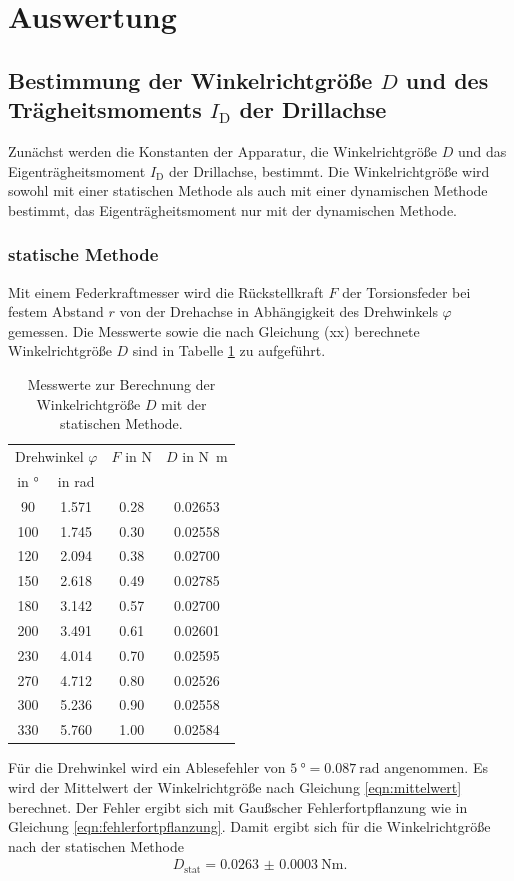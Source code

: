 \section{Auswertung}
\label{sec:Auswertung}
\subsection{Bestimmung der Winkelrichtgröße $D$ und des Trägheitsmoments
$I_\text{D}$ der Drillachse}
Zunächst werden die Konstanten der Apparatur, die Winkelrichtgröße $D$ und das
Eigenträgheitsmoment $I_\text{D}$ der Drillachse, bestimmt. Die Winkelrichtgröße
wird sowohl mit einer statischen Methode als auch mit einer dynamischen Methode
bestimmt, das Eigenträgheitsmoment nur mit der dynamischen Methode.

\subsubsection{statische Methode}
Mit einem Federkraftmesser wird die Rückstellkraft $F$ der Torsionsfeder bei festem
Abstand $r$ von der Drehachse in Abhängigkeit des Drehwinkels $\varphi$ gemessen.
Die Messwerte sowie die nach Gleichung (xx) berechnete Winkelrichtgröße $D$ sind
in Tabelle \ref{tab:statisch} zu aufgeführt.
\begin{table}[H]
  \centering
  \begin{tabular}{c c c c}
    \toprule
    \multicolumn{2}{c}{Drehwinkel $\varphi$} & $F$ in \si{\newton} & $D$ in \si{\newton\meter} \\
    in \si{\degree} & in \si{\radian} & & \\
    \midrule
    90  & 1.571 & 0.28 & 0.02653 \\
    100 & 1.745 & 0.30 & 0.02558 \\
    120 & 2.094 & 0.38 & 0.02700 \\
    150 & 2.618 & 0.49 & 0.02785 \\
    180 & 3.142 & 0.57 & 0.02700 \\
    200 & 3.491 & 0.61 & 0.02601 \\
    230 & 4.014 & 0.70 & 0.02595 \\
    270 & 4.712 & 0.80 & 0.02526 \\
    300 & 5.236 & 0.90 & 0.02558 \\
    330 & 5.760 & 1.00 & 0.02584 \\
    \bottomrule
  \end{tabular}
  \caption{Messwerte zur Berechnung der Winkelrichtgröße $D$ mit der statischen
  Methode.}
  \label{tab:statisch}
\end{table}
Für die Drehwinkel wird ein Ablesefehler von $\SI{5}{\degree} = \SI{0.087}{\radian}$
angenommen. Es wird der Mittelwert der Winkelrichtgröße nach Gleichung
\eqref{eqn:mittelwert} berechnet. Der Fehler ergibt sich mit Gaußscher
Fehlerfortpflanzung wie in Gleichung \eqref{eqn:fehlerfortpflanzung}. Damit ergibt
sich für die Winkelrichtgröße nach der statischen Methode
\begin{align*}
  D_\text{stat} = \SI{0.0263(3)}{\newton\meter}.
\end{align*}

